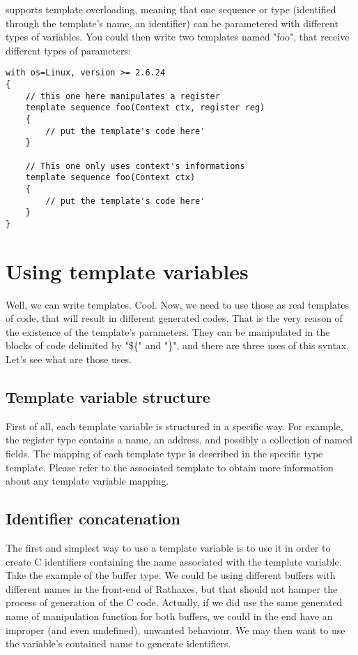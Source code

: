 \documentclass[american]{rtxreport}
\begin{document}
\rtx supports template overloading, meaning that one sequence or type
(identified through the template's name, an identifier) can be parametered with
different types of variables. You could then write two templates named "foo",
that receive different types of parameters:

\begin{lstlisting}
with os=Linux, version >= 2.6.24
{
    // this one here manipulates a register
    template sequence foo(Context ctx, register reg)
    {
        // put the template's code here'
    }

    // This one only uses context's informations
    template sequence foo(Context ctx)
    {
        // put the template's code here'
    }
}
\end{lstlisting}


\chapter{Using template variables}

Well, we can write templates. Cool. Now, we need to use those as real templates
of code, that will result in different generated codes. That is the very reason
of the existence of the template's parameters. They can be manipulated in the
blocks of code delimited by "\$\{" and "\}", and there are three uses of this
syntax. Let's see what are those uses.

\section{Template variable structure}

First of all, each template variable is structured in a specific way. For
example, the register type contains a name, an address, and possibly a
collection of named fields. The mapping of each template type is described in
the specific type template. Please refer to the associated template to obtain
more information about any template variable mapping.

\section{Identifier concatenation}

The first and simplest way to use a template variable is to use it in order to
create C identifiers containing the name associated with the template variable.
Take the example of the buffer type. We could be using different buffers with
different names in the front-end of Rathaxes, but that should not hamper the
process of generation of the C code. Actually, if we did use the same generated
name of manipulation function for both buffers, we could in the end have an
improper (and even undefined), unwanted behaviour. We may then want to use the
variable's contained name to generate identifiers.
\end{document}
